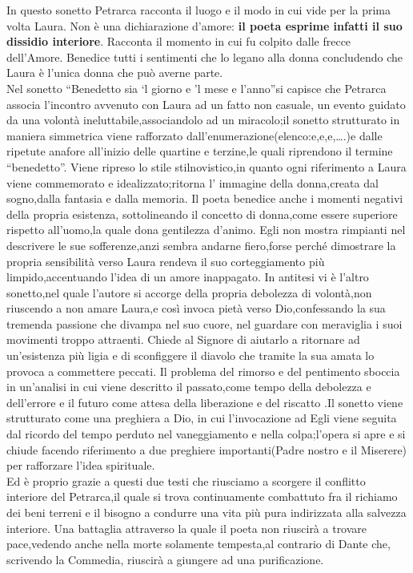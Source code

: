 \documentclass[10pt,a4paper]{article}
\begin{document}
In questo sonetto Petrarca racconta il luogo e il modo in cui vide per la prima volta Laura. Non è una dichiarazione d’amore: \textbf{il poeta esprime infatti il suo dissidio interiore}. Racconta il momento in cui fu colpito dalle frecce dell’Amore. Benedice tutti i sentimenti che lo legano alla donna concludendo che Laura è l’unica donna che può averne parte.\\

Nel sonetto “Benedetto sia ‘l giorno e ’l mese e l’anno”si capisce che Petrarca associa l’incontro avvenuto con Laura ad un fatto non casuale, un evento guidato da una volontà ineluttabile,associandolo ad un miracolo;il sonetto strutturato in maniera simmetrica viene rafforzato dall’enumerazione(elenco:e,e,e,….)e dalle ripetute anafore all’inizio delle quartine e terzine,le quali riprendono il termine “benedetto”. Viene ripreso lo stile stilnovistico,in quanto ogni riferimento a Laura viene commemorato e idealizzato;ritorna l’ immagine della donna,creata dal sogno,dalla fantasia e dalla memoria. Il poeta benedice anche i momenti negativi della propria esistenza, sottolineando il concetto di donna,come essere superiore rispetto all’uomo,la quale dona gentilezza d’animo. Egli non mostra rimpianti nel descrivere le sue sofferenze,anzi sembra andarne fiero,forse perché dimostrare la propria sensibilità verso Laura rendeva il suo corteggiamento più limpido,accentuando l’idea di un amore inappagato. In antitesi vi è l’altro sonetto,nel quale l’autore si accorge della propria debolezza di volontà,non riuscendo a non amare Laura,e così invoca pietà verso Dio,confessando la sua tremenda passione che divampa nel suo cuore, nel guardare con meraviglia i suoi movimenti troppo attraenti. Chiede al Signore di aiutarlo a ritornare ad un’esistenza più ligia e di sconfiggere il diavolo che tramite la sua amata lo provoca a commettere peccati. Il problema del rimorso e del pentimento sboccia in un’analisi in cui viene descritto il passato,come tempo della debolezza e dell’errore e il futuro come attesa della liberazione e del riscatto .Il sonetto viene strutturato come una preghiera a Dio, in cui l’invocazione ad Egli viene seguita dal ricordo del tempo perduto nel vaneggiamento e nella colpa;l’opera si apre e si chiude facendo riferimento a due preghiere importanti(Padre nostro e il Miserere) per rafforzare l’idea spirituale.\\

Ed è proprio grazie a questi due testi che riusciamo a scorgere il conflitto interiore del Petrarca,il quale si trova continuamente combattuto fra il richiamo dei beni terreni e il bisogno a condurre una vita più pura indirizzata alla salvezza interiore. Una battaglia attraverso la quale il poeta non riuscirà a trovare pace,vedendo anche nella morte solamente tempesta,al contrario di Dante che, scrivendo la Commedia, riuscirà a giungere ad una purificazione.
\end{document}
